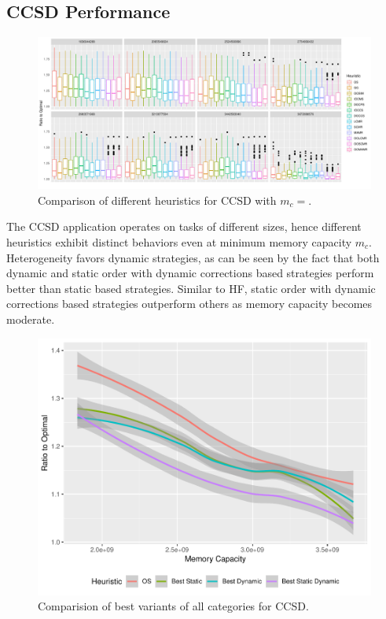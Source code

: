 \documentclass[sigconf]{acmart}
\begin{document}
{%
		
		\subsection{CCSD Performance}
		\begin{figure}[htb]
			\includegraphics[scale=0.5]{./all-binpack/ratio_to_optimal_selected_ccsd.pdf}
			\caption{Comparison of different heuristics for CCSD with $m_c=$.}
			\label{fig:ratio_to_optimal_ccsd}
		\end{figure}	
		
		The CCSD application operates on tasks of different sizes, hence different heuristics exhibit distinct behaviors even at minimum memory capacity $m_c$. Heterogeneity favors dynamic strategies, as can be seen by the fact that both dynamic and static order with dynamic corrections based strategies perform better than static based strategies. Similar to HF, static order with dynamic corrections based strategies outperform others as memory capacity becomes moderate. 
		
		
		\begin{figure}[htb]
			\includegraphics[scale=0.5]{./results/plots/ratio_to_optimal_ccsd-best.pdf}
			\caption{Comparision of best variants of all categories for CCSD.}
			\label{fig:ratio_to_optimal_best_ccsd}
		\end{figure}
		
}
\end{document}
